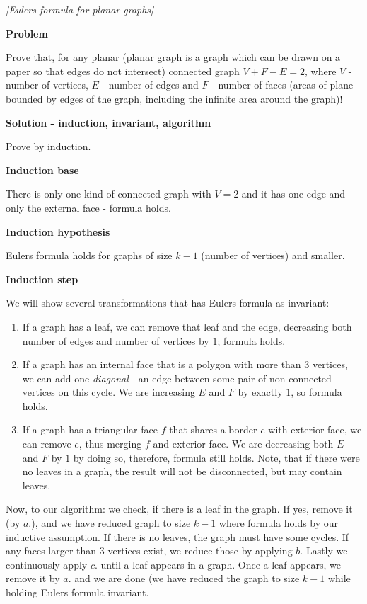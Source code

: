 \begin{problem}
\textit{[Eulers formula for planar graphs]}

\textbf{Problem}

Prove that, for any planar (planar graph is a graph which can be drawn on a paper so that edges do not intersect) connected graph $V+F-E=2$, where $V$ - number of vertices, $E$ - number of edges and $F$ - number of faces (areas of plane bounded by edges of the graph, including the infinite area around the graph)!

\textbf{Solution - induction, invariant, algorithm}

Prove by induction. 

\textbf{Induction base}

There is only one kind of connected graph with $V=2$ and it has one edge and only the external face - formula holds.

\textbf{Induction hypothesis}

Eulers formula holds for graphs of size $k-1$ (number of vertices) and smaller.

\textbf{Induction step}

We will show several transformations that has Eulers formula as invariant:
\begin{enumerate}
\item If a graph has a leaf, we can remove that leaf and the edge, decreasing both number of edges and number of vertices by $1$; formula holds.
\item If a graph has an internal face that is a polygon with more than $3$ vertices, we can add one \textit{diagonal} - an edge between some pair of non-connected vertices on this cycle. We are increasing $E$ and $F$ by exactly $1$, so formula holds.
\item If a graph has a triangular face $f$ that shares a border $e$ with exterior face, we can remove $e$, thus merging $f$ and exterior face. We are decreasing both $E$ and $F$ by $1$ by doing so, therefore, formula still holds. Note, that if there were no leaves in a graph, the result will not be disconnected, but may contain leaves.
\end{enumerate}

Now, to our algorithm: we check, if there is a leaf in the graph. If yes, remove it (by $a$.), and we have reduced graph to size $k-1$ where formula holds by our inductive assumption.
If there is no leaves, the graph must have some cycles. If any faces larger than $3$ vertices exist, we reduce those by applying $b$. 
Lastly we continuously apply $c$. until a leaf appears in a graph. Once a leaf appears, we remove it by $a.$ and we are done (we have reduced the graph to size $k-1$ while holding Eulers formula invariant.
\end{problem}



